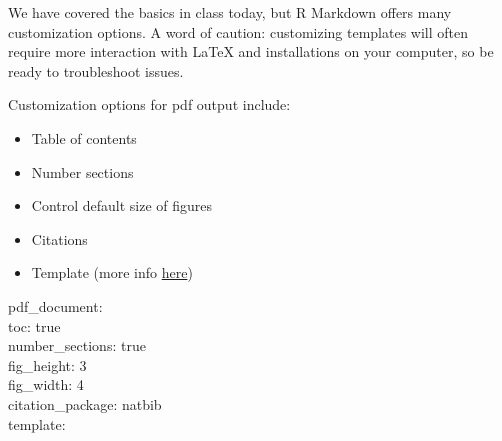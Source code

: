 \documentclass[]{article}
\providecommand{\tightlist}{%
  \setlength{\itemsep}{0pt}\setlength{\parskip}{0pt}}
\begin{document}
We have covered the basics in class today, but R Markdown offers many
customization options. A word of caution: customizing templates will
often require more interaction with LaTeX and installations on your
computer, so be ready to troubleshoot issues.

Customization options for pdf output include:

\begin{itemize}
\tightlist
\item
  Table of contents
\item
  Number sections
\item
  Control default size of figures
\item
  Citations
\item
  Template (more info
  \href{http://jianghao.wang/post/2017-12-08-rmarkdown-templates/}{here})
\end{itemize}

pdf\_document:\\
toc: true\\
number\_sections: true\\
fig\_height: 3\\
fig\_width: 4\\
citation\_package: natbib\\
template:
\end{document}

